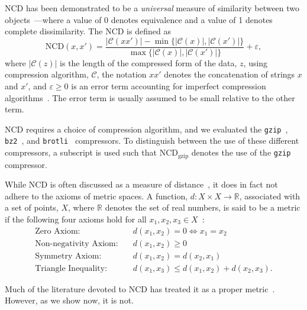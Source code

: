 \documentclass[preprint,12pt]{article}
\begin{document}
NCD has been demonstrated to be a \textit{universal} measure of similarity between two objects~\cite{ncd}---where a value of 0 denotes equivalence and a value of 1 denotes complete dissimilarity.
The NCD is defined as~\cite{ncd}
\begin{equation}
    \text{NCD}(x, x') = \frac{|\mathcal{C}(xx')| - \min\{|\mathcal{C}(x)|, |\mathcal{C}(x')|\}}{\max\{|\mathcal{C}(x)|, |\mathcal{C}(x')|\}} + \varepsilon,
    \label{eq:ncd}
\end{equation}
where $|\mathcal{C}(z)|$ is the length of the compressed form of the data, $z$, using compression algorithm, $\mathcal{C}$, the notation $xx'$ denotes the concatenation of strings $x$ and $x'$, and $\varepsilon\geq0$ is an error term accounting for imperfect compression algorithms~\cite{ncd}. The error term is usually assumed to be small relative to the other term.

NCD requires a choice of compression algorithm, and we evaluated the \texttt{gzip}~\cite{gzip}, \texttt{bz2}~\cite{bz2}, and \texttt{brotli}~\cite{google} compressors.
To distinguish between the use of these different compressors, a subscript is used such that NCD$_{\text{gzip}}$ denotes the use of the \texttt{gzip} compressor.

While NCD is often discussed as a measure of distance~\cite{opitz2023gzip,weinreich2023parameter,nishida2011tweet,jiang2022less,ncd}, it does in fact not adhere to the axioms of metric spaces.
A function, $d:X \times X \rightarrow \mathbb{R}$, associated with a set of points, $X$, where $\mathbb{R}$ denotes the set of real numbers, is said to be a metric if the following four axioms hold for all $x_1, x_2, x_3 \in X$~\cite{metrics}:
\begin{align}
    \text{Zero Axiom:} \quad & d(x_1,x_2) = 0 \iff x_1 = x_2 \label{eq:axiom_zero} \\
    \text{Non-negativity Axiom:} \quad & d(x_1,x_2) \geq 0 \label{eq:axiom_nonnegativity} \\
    \text{Symmetry Axiom:} \quad & d(x_1,x_2) = d(x_2, x_1) \label{eq:axiom_symmetry} \\
    \text{Triangle Inequality:} \quad & d(x_1,x_3) \leq d(x_1,x_2) + d(x_2,x_3) \label{eq:axiom_triangle}.
\end{align}

Much of the literature devoted to NCD has treated it as a proper metric~\cite{opitz2023gzip,weinreich2023parameter,nishida2011tweet,jiang2022less}. 
However, as we show now, it is not.
\end{document}
